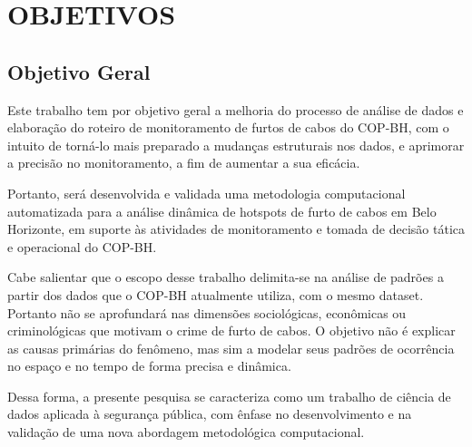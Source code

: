 \section{OBJETIVOS}
\label{sec:objetivos}
\subsection{Objetivo Geral}
\label{subsec:objgeral}

Este trabalho tem por objetivo geral a melhoria do processo de análise de dados e elaboração do roteiro de monitoramento de furtos de cabos do COP-BH, com o intuito de torná-lo mais preparado a mudanças estruturais nos dados, e aprimorar a precisão no monitoramento, a fim de aumentar a sua eficácia.

Portanto, será desenvolvida e validada uma metodologia computacional automatizada para a análise dinâmica de hotspots de furto de cabos em Belo Horizonte, em suporte às atividades de monitoramento e tomada de decisão tática e operacional do COP-BH.

Cabe salientar que o escopo desse trabalho delimita-se na análise de padrões a partir dos dados que o COP-BH atualmente utiliza, com o mesmo dataset. Portanto não se aprofundará nas dimensões sociológicas, econômicas ou criminológicas que motivam o crime de furto de cabos. O objetivo não é explicar as causas primárias do fenômeno, mas sim a modelar seus padrões de ocorrência no espaço e no tempo de forma precisa e dinâmica.

Dessa forma, a presente pesquisa se caracteriza como um trabalho de ciência de dados aplicada à segurança pública, com ênfase no desenvolvimento e na validação de uma nova abordagem metodológica computacional.

